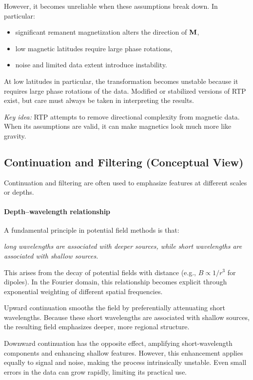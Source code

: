 However, it becomes unreliable when these assumptions break down. In particular:
\begin{itemize}
    \item significant remanent magnetization alters the direction of $\vb{M}$,
    \item low magnetic latitudes require large phase rotations,
    \item noise and limited data extent introduce instability.
\end{itemize}

At low latitudes in particular, the transformation becomes unstable because it requires large phase rotations of the data. Modified or stabilized versions of RTP exist, but care must always be taken in interpreting the results.

\emph{Key idea:} RTP attempts to remove directional complexity from magnetic data. When its assumptions are valid, it can make magnetics look much more like gravity.

\subsection{Continuation and Filtering (Conceptual View)}

Continuation and filtering are often used to emphasize features at different scales or depths.

\paragraph{Depth--wavelength relationship}

A fundamental principle in potential field methods is that:
\begin{center}
\emph{long wavelengths are associated with deeper sources, while short wavelengths are associated with shallow sources.}
\end{center}

This arises from the decay of potential fields with distance (e.g., $B \propto 1/r^3$ for dipoles). In the Fourier domain, this relationship becomes explicit through exponential weighting of different spatial frequencies.

Upward continuation smooths the field by preferentially attenuating short wavelengths. Because these short wavelengths are associated with shallow sources, the resulting field emphasizes deeper, more regional structure.

Downward continuation has the opposite effect, amplifying short-wavelength components and enhancing shallow features. However, this enhancement applies equally to signal and noise, making the process intrinsically unstable. Even small errors in the data can grow rapidly, limiting its practical use.

